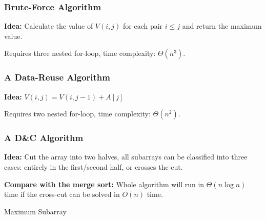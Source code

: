 \documentclass[10pt]{article}
\begin{document}
\subsubsection*{Brute-Force Algorithm}

\textbf{Idea:} Calculate the value of $V(i, j)$ for each pair $i\leq j$ and return the maximum value.

Requires three nested for-loop, time complexity: $\Theta(n^3)$.

\subsubsection*{A Data-Reuse Algorithm}

\textbf{Idea:} $V(i, j) = V(i, j-1) + A[j]$

Requires two nested for-loop, time complexity: $\Theta(n^2)$.

\newpage

\subsubsection{A D\&C Algorithm}

\textbf{Idea:} Cut the array into two halves, all subarrays can be classified into three cases: entirely in the first/second half, or crosses the cut.

\textbf{Compare with the merge sort:} Whole algorithm will run in $\Theta(n\log n)$ time if the cross-cut can be solved in $O(n)$ time.

\begin{algorithm}
	\SetAlgoLined
	\caption{Maximum Subarray}
\end{algorithm}
\end{document}
